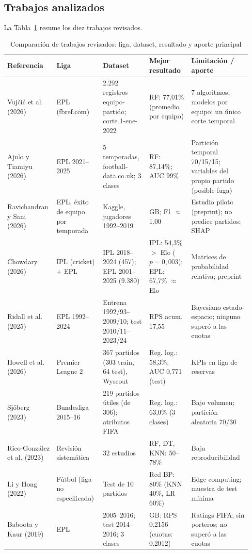 \documentclass{ieeeaccess}
\begin{document}
\subsection{Trabajos analizados}
La Tabla~\ref{tab:literatura} resume los diez trabajos revisados.

\begin{table}[!t]
\caption{Comparación de trabajos revisados: liga, dataset, resultado y aporte principal}
\label{tab:literatura}
\setlength{\tabcolsep}{2pt}
\footnotesize
\begin{tabular}{@{}p{3.2cm}p{2.2cm}p{3.4cm}p{2.6cm}p{4.6cm}@{}}
\toprule
\textbf{Referencia} & \textbf{Liga} & \textbf{Dataset} & \textbf{Mejor resultado} & \textbf{Limitación / aporte} \\
\midrule
Vujčić et al. (2026)~\cite{vujcic2026supervised} & EPL (fbref.com) & 2.292 registros equipo-partido; corte 1-ene-2022 & RF: 77,01\% (promedio por equipo) & 7 algoritmos; modelos por equipo; un único corte temporal \\
Ajulo y Tiamiyu (2026)~\cite{ajulo2026ml} & EPL 2021--2025 & 5 temporadas, football-data.co.uk; 3 clases & RF: 87,14\%; AUC 99\% & Partición temporal 70/15/15; variables del propio partido (posible fuga) \\
Ravichandran y Sani (2026)~\cite{ravichandran2026framework} & EPL, éxito de equipo por temporada & Kaggle, jugadores 1992--2019 & GB; F1 $\approx$ 1,00 & Estudio piloto (preprint); no predice partidos; SHAP \\
Chowdary (2026)~\cite{chowdary2026dynamic} & IPL (cricket) + EPL & IPL 2018--2024 (457); EPL 2001--2025 (9.380) & IPL: 54,3\% $>$ Elo ($p=0{,}003$); EPL: 67,7\% $\approx$ Elo & Matrices de probabilidad relativa; preprint \\
Ridall et al. (2025)~\cite{ridall2025bayesian} & EPL 1992--2024 & Entrena 1992/93--2009/10; test 2010/11--2023/24 & RPS acum. 17,55 & Bayesiano estado-espacio; ninguno superó a las cuotas \\
Howell et al. (2026)~\cite{howell2026winning} & Premier League 2 & 367 partidos (303 train, 64 test), Wyscout & Reg. log.: 58,3\%; AUC 0,771 (test) & KPIs en liga de reservas \\
Sjöberg (2023)~\cite{sjoborg2023football} & Bundesliga 2015--16 & 219 partidos útiles (de 306); atributos FIFA & Reg. log.: 63,0\% (3 clases) & Bajo volumen; partición aleatoria 70/30 \\
Rico-González et al. (2023)~\cite{ricogonzalez2023ml} & Revisión sistemática & 32 estudios & RF, DT, KNN: 50--78\% & Baja reproducibilidad \\
Li y Hong (2022)~\cite{li2022football} & Fútbol (liga no especificada) & Test de 10 partidos & Red BP: 80\% (KNN 40\%, LR 60\%) & Edge computing; muestra de test mínima \\
Baboota y Kaur (2019)~\cite{baboota2019predictive} & EPL & 2005--2016; test 2014--2016; 3 clases & GB: RPS 0,2156 (cuotas: 0,2012) & Ratings FIFA; sin porteros; no superó a las cuotas \\
\bottomrule
\end{tabular}
\end{table}
\end{document}
